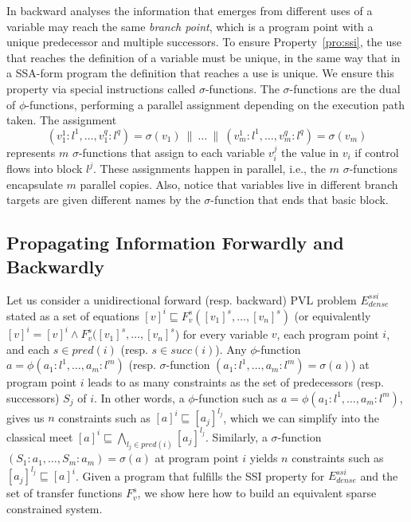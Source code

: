 In backward analyses the information that emerges from different uses of a variable may reach the same {\em branch point}, which is a program point with a unique predecessor and multiple successors.
To ensure Property~\ref{pro:ssi}, the use that reaches the definition of a
variable must be unique, in the same way that in a SSA-form program the definition that reaches a use is unique.
We ensure this property via special instructions called $\sigma$-functions.
The $\sigma$-functions are the dual of $\phi$-functions, performing a parallel assignment depending on the execution path taken.
The assignment \[(v_1^1:l^1, \ldots, v_1^q:l^q) = \sigma(v_1) \ \parallel\  \dots \ \parallel\  (v_m^1:l^1, \ldots, v_m^q:l^q) = \sigma(v_m)\] represents $m$ $\sigma$-functions that assign to each variable $v_i^j$ the value in $v_i$ if control flows into block $l^j$.
These assignments happen in parallel, i.e., the $m$ $\sigma$-functions encapsulate $m$ parallel copies.
Also, notice that variables live in different branch targets are given
different names by the $\sigma$-function that ends that basic block.

\subsection{Propagating Information Forwardly and Backwardly}

Let us consider a unidirectional forward (resp. backward) PVL problem $E^{ssi}_{\mathit{dense}}$ stated as a set of equations $[v]^i \sqsubseteq  F_v^s([v_1]^s, \dots, [v_n]^s)$ (or equivalently $[v]^i = [v]^i \wedge    F_v^s([v_1]^s, \dots, [v_n]^s$) for every variable $v$, each program point $i$, and each $s \in \mathit{pred}(i)$ (resp. $s \in \mathit{succ}(i)$). 
Any $\phi$-function $a=\phi(a_1:l^1,\dots,a_m:l^m)$ (resp. $\sigma$-function $(a_1:l^1,\dots,a_m:l^m)=\sigma(a)$) at program point $i$ leads to as many constraints as the set of predecessors (resp. successors) $S_j$ of $i$.
In other words, a $\phi$-function such as $a=\phi(a_1:l^1,\dots,a_m:l^m)$, gives us $n$ constraints such as $[a]^i \sqsubseteq [a_j]^{l_j}$, which we can simplify into the classical meet $[a]^i \sqsubseteq \bigwedge_{l_j \in \mathit{pred}(i)} [a_j]^{l_j}$.
Similarly, a $\sigma$-function $(S_1:a_1,\dots,S_m:a_m)=\sigma(a)$ at program point $i$ yields $n$ constraints such as $[a_j]^{l_j} \sqsubseteq [a]^i$.
Given a program that fulfills the SSI property for $E^{ssi}_{\mathit{dense}}$ and the set of transfer functions $F_v^s$, we show here how to build an equivalent sparse constrained system.  

